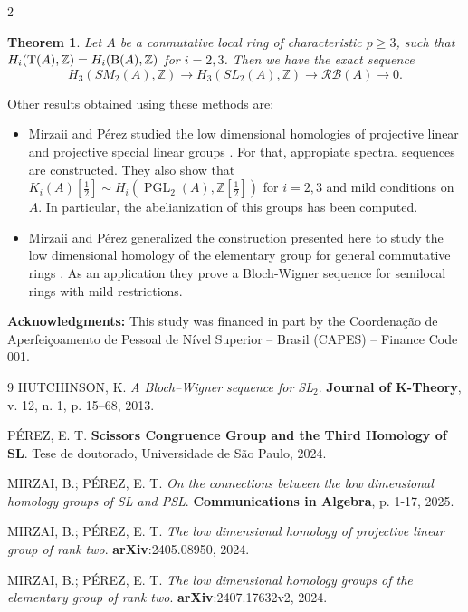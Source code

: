\documentclass[a0]{sciposter}
\newtheorem{thm}{Theorem}
\theoremstyle{definition}
\newcommand{\z}{\mathbb{Z}}
\newcommand{\Bb}{{\rm B}}
\newcommand{\Tt}{{\rm T}}
\begin{document}
\begin{multicols}{2}
\begin{thm}
Let $A$ be a conmutative local ring of characteristic $p \geq 3$, such that $H_i(\Tt(A),\z) = H_i(\Bb(A),\z)$ for $i=2,3$. Then we have the exact sequence $$H_3\left(S M_2(A), \mathbb{Z}\right) \rightarrow H_3\left(S L_2(A), \mathbb{Z}\right) \rightarrow \mathcal{RB}(A) \rightarrow 0. $$
\end{thm}

Other results obtained using these methods are:
\begin{itemize}
    \item Mirzaii and Pérez studied the low dimensional homologies of projective linear and projective special linear groups \cite{uno,dos}. For that, appropiate spectral sequences are constructed. They also show that $K_i(A) [\frac{1}{2}]  \sim H_i(\operatorname{PGL}_2 (A),\z [\frac{1}{2}])$ for $i=2,3$ and mild conditions on $A$. In particular, the abelianization of this groups has been computed.
    \item Mirzaii and Pérez generalized the construction presented here to study the low dimensional homology of the elementary group for general commutative rings \cite{tres}. As an application they prove a Bloch-Wigner sequence for semilocal rings with mild restrictions.
\end{itemize}
\textbf{Acknowledgments:} This study was financed in part by the Coordena\c{c}\~{a}o de Aperfei\c{c}oamento de Pessoal de N\'{i}vel Superior -- Brasil (CAPES) -- Finance Code 001.



\begin{thebibliography}{9}
    HUTCHINSON, K. \textit{A Bloch–Wigner sequence for SL$_2$}. \textbf{Journal of K-Theory}, v. 12, n. 1, p. 15–68, 2013.

    PÉREZ, E. T. \textbf{Scissors Congruence Group and the Third Homology of SL}. Tese de doutorado, Universidade de São Paulo, 2024.

    MIRZAI, B.; PÉREZ, E. T. \textit{On the connections between the low dimensional homology groups of SL and PSL}. \textbf{Communications in Algebra}, p. 1-17, 2025.

    MIRZAI, B.; PÉREZ, E. T. \textit{The low dimensional homology of projective linear group of rank two}. \textbf{arXiv}:2405.08950, 2024.

    MIRZAI, B.; PÉREZ, E. T. \textit{The low dimensional homology groups of the elementary group of rank two}. \textbf{arXiv}:2407.17632v2, 2024.

\end{thebibliography}

\end{multicols}
\end{document}

